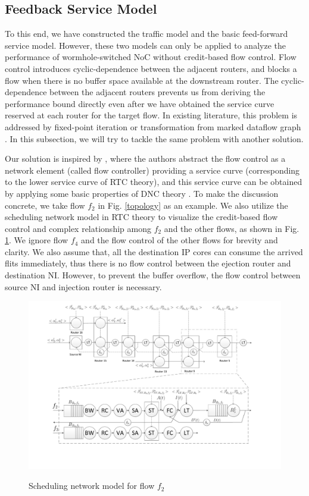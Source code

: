 \documentclass[preprint]{elsarticle}
\begin{document}
\subsection{Feedback Service Model}\label{flowcontrol}
To this end, we have constructed the traffic model and the basic feed-forward service model. However, these two models can only be applied to analyze the performance of wormhole-switched NoC without credit-based flow control. Flow control introduces cyclic-dependence between the adjacent routers, and blocks a flow when there is no buffer space available at the downstream router. The cyclic-dependence between the adjacent routers prevents us from deriving the performance bound directly even after we have obtained the service curve reserved at each router for the target flow. In existing literature, this problem is addressed by fixed-point iteration \cite{schioler2005network} or transformation from marked dataflow graph \cite{Thiele:2009:MPA:1629335.1629353}. In this subsection, we will try to tackle the same problem with another solution.

Our solution is inspired by \cite{qian2009analysis}, where the authors abstract the flow control as a network element (called flow controller) providing a service curve (corresponding to the lower service curve of RTC theory), and this service curve can be obtained by applying some basic properties of DNC theory \cite{Boudec2001Network}. To make the discussion concrete, we take flow $f_2$ in Fig. \ref{topology} as an example. We also utilize the scheduling network model \cite{1253607} in RTC theory to visualize the credit-based flow control and complex relationship among $f_2$ and the other flows, as shown in Fig. \ref{f2}. We ignore flow $f_4$ and the flow control of the other flows for brevity and clarity. We also assume that, all the destination IP cores can consume the arrived flits immediately, thus there is no flow control between the ejection router and destination NI. However, to prevent the buffer overflow, the flow control between source NI and injection router is necessary.
\begin{figure}
  \centering
  \includegraphics[scale=0.35]{fig7.pdf}\\
  \caption{Scheduling network model for flow $f_2$}\label{f2}
\end{figure}
\end{document}
